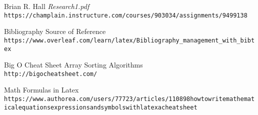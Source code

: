 \documentclass{article}
\begin{document}
\clearpage

\begin{thebibliography}{9}

Brian R. Hall \textit{Research1.pdf}
\\\texttt{https://champlain.instructure.com/courses/903034/assignments/9499138} 

 
Bibliography Source of Reference
\\\texttt{https://www.overleaf.com/learn/latex/Bibliography\_{}management\_{}with\_{}bibtex}


Big O Cheat Sheet
Array Sorting Algorithms
\\\texttt{http://bigocheatsheet.com/}

Math Formulas in Latex
\\\texttt{https://www.authorea.com/users/77723/articles/110898\-{}how\-{}to\-{}write\-{}mathematical\-{}equations\-{}expressions\-{}and\-{}symbols\-{}with\-{}latex\-{}a\-{}cheatsheet}

\end{thebibliography}
\end{document}
